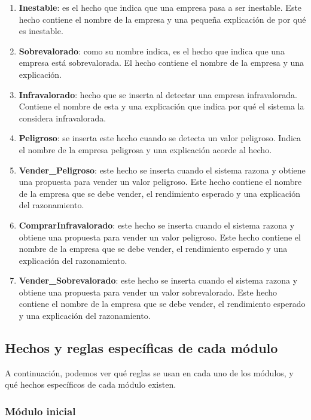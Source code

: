 \documentclass[10pt,spanish]{article}
\theoremstyle{plain}
\theoremstyle{definition}
\begin{document}
\begin{enumerate}[---]
    \item \textbf{Inestable}: es el hecho que indica que una empresa pasa a ser inestable. Este hecho contiene el nombre de la empresa y una pequeña explicación de por qué es inestable.
    \item \textbf{Sobrevalorado}: como su nombre indica, es el hecho que indica que una empresa está sobrevalorada. El hecho contiene el nombre de la empresa y una explicación.
    \item \textbf{Infravalorado}: hecho que se inserta al detectar una empresa infravalorada. Contiene el nombre de esta y una explicación que indica por qué el sistema la considera infravalorada.
    \item \textbf{Peligroso}: se inserta este hecho cuando se detecta un valor peligroso. Indica el nombre de la empresa peligrosa y una explicación acorde al hecho.
    \item \textbf{Vender\_Peligroso}: este hecho se inserta cuando el sistema razona y obtiene una propuesta para vender un valor peligroso. Este hecho contiene el nombre de la empresa que se debe vender, el rendimiento esperado y una explicación del razonamiento.
    \item \textbf{ComprarInfravalorado}: este hecho se inserta cuando el sistema razona y obtiene una propuesta para vender un valor peligroso. Este hecho contiene el nombre de la empresa que se debe vender, el rendimiento esperado y una explicación del razonamiento.
    \item \textbf{Vender\_Sobrevalorado}: este hecho se inserta cuando el sistema razona y obtiene una propuesta para vender un valor sobrevalorado. Este hecho contiene el nombre de la empresa que se debe vender, el rendimiento esperado y una explicación del razonamiento.
\end{enumerate}

\subsection{Hechos y reglas específicas de cada módulo}

A continuación, podemos ver qué reglas se usan en cada uno de los módulos, y qué hechos específicos de cada módulo existen.

\subsubsection{Módulo inicial}
\end{document}
